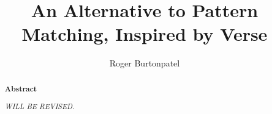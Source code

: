 \documentclass[manuscript,screen,review, 12pt]{acmart}
\begin{document}
\title{An Alternative to Pattern Matching, Inspired by Verse}

\author{Roger Burtonpatel}



\renewcommand{\shortauthors}{Burtonpatel et al.}

\begin{abstract}
    \bf{Abstract}

    \it{WILL BE REVISED.}
  


  \end{abstract}

\maketitle

    
\end{document}
